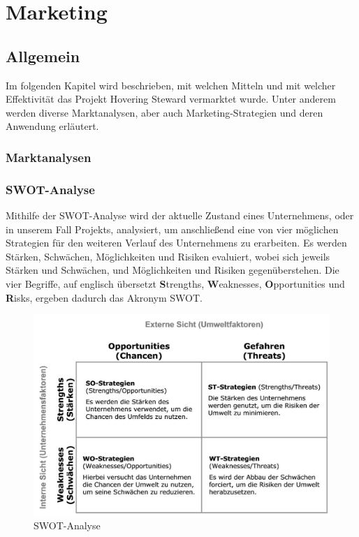\chapter{Marketing}
\renewcommand{\kapitelautor}{Autor: Markus Kaiser}

\section{Allgemein}
Im folgenden Kapitel wird beschrieben, mit welchen Mitteln und mit welcher Effektivität
das Projekt Hovering Steward vermarktet wurde. Unter anderem werden diverse Marktanalysen,
aber auch Marketing-Strategien und deren Anwendung erläutert.

  \subsection{Marktanalysen}
    \subsection*{SWOT-Analyse}
    Mithilfe der SWOT-Analyse wird der aktuelle Zustand eines Unternehmens, oder in unserem Fall Projekts, analysiert, um anschließend eine von vier möglichen Strategien
    für den weiteren Verlauf des Unternehmens zu erarbeiten. Es werden Stärken, Schwächen, Möglichkeiten und Risiken evaluiert, wobei sich jeweils Stärken und Schwächen, und
    Möglichkeiten und Risiken gegenüberstehen. Die vier Begriffe, auf englisch übersetzt \textbf{S}trengths, \textbf{W}eaknesses, \textbf{O}pportunities und \textbf{R}isks,
    ergeben dadurch das Akronym SWOT.

    \begin{figure}[H]
      \begin{centering}
      \includegraphics[width = 1\textwidth]{Bilder/swot.jpg}
      \par\end{centering}
      \caption[SWOT-Analyse]{SWOT-Analyse\cite{pic_swot}}
      \label{swot}
    \end{figure}

